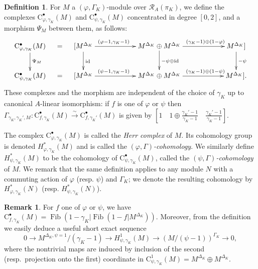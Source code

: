 \documentclass[12pt]{article}
\theoremstyle{definition}
\newtheorem{defn}[theorem]{Definition}
\newtheorem{remark}[theorem]{Remark}
\numberwithin{equation}{theorem}
\newcommand{\calR}{\mathcal{R}}
\newcommand{\rmC}{\mathrm{C}}
\newcommand{\id}{\mathrm{id}}
\DeclareMathOperator{\Fib}{Fib}
\begin{document}
\begin{defn}
\label{D:varphi Gamma cohomology}
For $M$ a  $(\varphi, \Gamma_K)$-module over $\calR_A(\pi_K)$, we define the complexes $\rmC^\bullet_{\varphi, \gamma_K}(M)$ and $\rmC^\bullet_{\psi, \gamma_K}(M)$ concentrated in degree $[0,2]$, and a morphism $\Psi_M$ between them, as follows:
\begin{equation}
\label{E:Herr-complex}
\xymatrix@C=10pt{
\rmC^\bullet_{\varphi, \gamma_K}(M) \ar[d]^{\Psi_M} & = &
[ M^{\Delta_K} \ar^(.4){(\varphi-1,\gamma_K-1)}[rrrr]\ar^{\id}[d] &&&& M^{\Delta_K} \oplus M^{\Delta_K} \ar^(.6){(\gamma_K-1) \oplus (1-\varphi)}[rrrr] \ar^{-\psi \oplus \id}[d] &&&& M^{\Delta_K}] \ar^{-\psi}[d] \\
\rmC^\bullet_{\psi, \gamma_K}(M) & = & [M^{\Delta_K} \ar^(.4){(\psi-1,\gamma_K-1)}[rrrr] &&&& M^{\Delta_K} \oplus M^{\Delta_K} \ar^(.6){(\gamma_K-1) \oplus (1-\psi)}[rrrr] &&&& M^{\Delta_K}].
}
\end{equation}
These complexes and the morphism are independent of the choice of
$\gamma_K$ up to canonical $A$-linear isomorphism: if $f$ is one of
$\varphi$ or $\psi$ then $\Gamma_{\gamma_K,\gamma_K',M} :
\rmC_{f,\gamma_K}^\bullet(M) \stackrel\sim\to
\rmC_{f,\gamma_K'}^\bullet(M)$ is given by $[1 \quad 1 \oplus
  \frac{\gamma_K'-1}{\gamma_K-1} \quad
  \frac{\gamma_K'-1}{\gamma_K-1}]$.

The complex $\rmC_{\varphi,\gamma_K}^\bullet(M)$ is called the \emph{Herr complex} of $M$.  Its cohomology group is denoted
$H^*_{\varphi, \gamma_K}(M)$ and is called the \emph{$(\varphi, \Gamma)$-cohomology}.
 We similarly define $H^*_{\psi, \gamma_K}(M)$ to be the cohomology of $\rmC^\bullet_{\psi, \gamma_K}(M)$, called the \emph{$(\psi, \Gamma)$-cohomology} of $M$.  
We remark that the same definition applies to any module $N$ with a commuting action of $\varphi$ (resp. $\psi$) and $\Gamma_K$; we denote the resulting cohomology by $H^*_{\varphi, \gamma_K}(N)$ (resp. $H^*_{\psi, \gamma_K}(N)$).
\end{defn}


\begin{remark}\label{R:useful-sequence}
For $f$ one of $\varphi$ or $\psi$, we have
$\rmC_{f,\gamma_K}^\bullet(M) =
\Fib(1-\gamma_K|\Fib(1-f|M^{\Delta_K}))$.  Moreover, from the
definition we easily deduce a useful short exact sequence
\[
0 \to M^{\Delta_K,\psi=1}/(\gamma_K-1) \to H^1_{\psi, \gamma_K}(M) \to
(M/(\psi-1))^{\Gamma_K} \to 0,
\]
where the nontrivial maps are induced by inclusion of the second
(resp.\ projection onto the first) coordinate in
$\rmC^1_{\psi,\gamma_K}(M) = M^{\Delta_K} \oplus M^{\Delta_K}$.
\end{remark}
\end{document}
